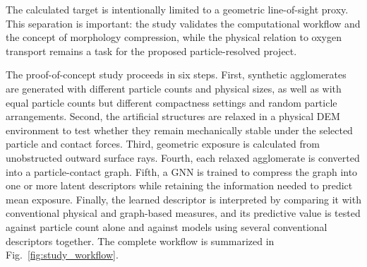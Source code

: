 \documentclass[12pt,a4paper]{article}
\begin{document}
The calculated target is intentionally limited to a geometric line-of-sight proxy.
This separation is important: the study validates the computational workflow
and the concept of morphology compression, while the physical relation to
oxygen transport remains a task for the proposed particle-resolved project.

The proof-of-concept study proceeds in six steps. First, synthetic
agglomerates are generated with different particle counts and physical sizes,
as well as with equal particle counts but different compactness settings and
random particle arrangements. Second, the artificial structures are relaxed
in a physical DEM environment to test whether they remain mechanically stable
under the selected particle and contact forces. Third, geometric exposure is
calculated from unobstructed outward surface rays. Fourth, each relaxed agglomerate is converted into a
particle-contact graph. Fifth, a GNN is trained to compress the graph into one
or more latent descriptors while retaining the information needed to predict
mean exposure. Finally, the learned descriptor is interpreted by comparing
it with conventional physical and graph-based measures, and its predictive
value is tested against particle count alone and against models using several
conventional descriptors together. The complete workflow is summarized in
Fig.~\ref{fig:study_workflow}.
\end{document}
